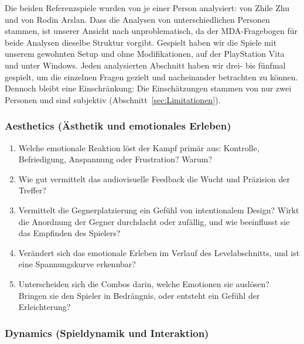 \documentclass[../Main.tex]{subfiles}
\begin{document}
Die beiden Referenzspiele wurden von je einer Person analysiert:  von Zhile Zhu und  von Rodin Arslan. Dass die Analysen von unterschiedlichen Personen stammen, ist unserer Ansicht nach unproblematisch, da der MDA-Fragebogen für beide Analysen dieselbe Struktur vorgibt. Gespielt haben wir die Spiele mit unserem gewohnten Setup und ohne Modifikationen,  auf der PlayStation Vita und  unter Windows. Jeden analysierten Abschnitt haben wir drei- bis fünfmal gespielt, um die einzelnen Fragen gezielt und nacheinander betrachten zu können. Dennoch bleibt eine Einschränkung: Die Einschätzungen stammen von nur zwei Personen und sind subjektiv (Abschnitt~\ref{sec:Limitationen}).

\subsubsection{Aesthetics (Ästhetik und emotionales Erleben)}

\begin{enumerate}[label=\textbf{A\arabic*}, leftmargin=1.5cm, itemsep=0.5em]
    \item Welche emotionale Reaktion löst der Kampf primär aus: Kontrolle, Befriedigung, Anspannung oder Frustration? Warum?
    \item Wie gut vermittelt das audiovisuelle Feedback die Wucht und Präzision der Treffer?
    \item Vermittelt die Gegnerplatzierung ein Gefühl von intentionalem Design? Wirkt die Anordnung der Gegner durchdacht oder zufällig, und wie beeinflusst sie das Empfinden des Spielers?
    \item Verändert sich das emotionale Erleben im Verlauf des Levelabschnitts, und ist eine Spannungskurve erkennbar?
    \item Unterscheiden sich die Combos darin, welche Emotionen sie auslösen? Bringen sie den Spieler in Bedrängnis, oder entsteht ein Gefühl der Erleichterung?
\end{enumerate}

\subsubsection{Dynamics (Spieldynamik und Interaktion)}
\end{document}
